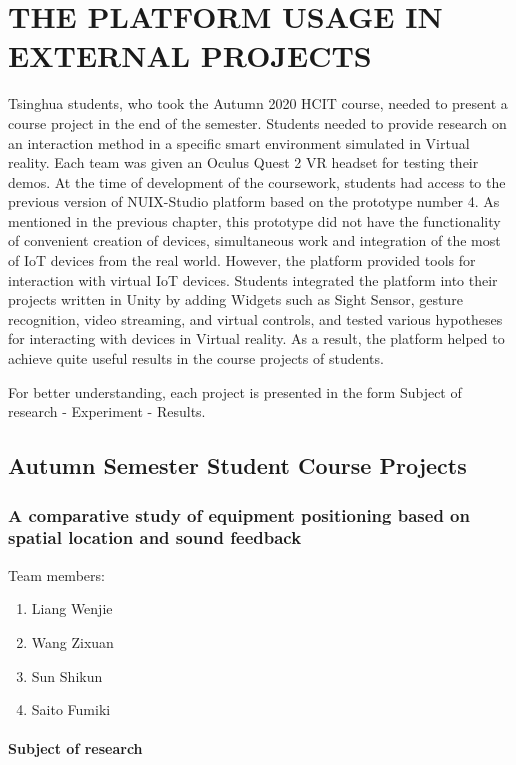
\chapter{THE PLATFORM USAGE IN EXTERNAL PROJECTS}

Tsinghua students, who took the Autumn 2020 HCIT course, needed to present a course project in the end of the semester. Students needed to provide research on an interaction method in a specific smart environment simulated in Virtual reality. Each team was given an Oculus Quest 2 VR headset for testing their demos. At the time of development of the coursework, students had access to the previous version of NUIX-Studio platform based on the prototype number 4. As mentioned in the previous chapter, this prototype did not have the functionality of convenient creation of devices, simultaneous work and integration of the most of IoT devices from the real world. However, the platform provided tools for interaction with virtual IoT devices. Students integrated the platform into their projects written in Unity by adding Widgets such as Sight Sensor, gesture recognition, video streaming, and virtual controls, and tested various hypotheses for interacting with devices in Virtual reality. As a result, the platform helped to achieve quite useful results in the course projects of students.

For better understanding, each project is presented in the form Subject of research - Experiment - Results. 

\section{Autumn Semester Student Course Projects}

\subsection{A comparative study of equipment positioning based on spatial location and sound feedback}

Team members:
\begin{enumerate}
    \item Liang Wenjie
    \item Wang Zixuan
    \item Sun Shikun
    \item Saito Fumiki
\end{enumerate}


\subsubsection{Subject of research}

